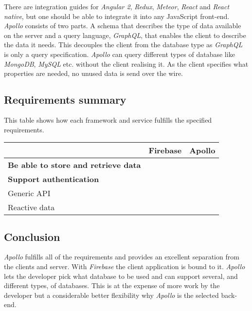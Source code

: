 There are integration guides for \textit{Angular 2}, \textit{Redux}, \textit{Meteor}, \textit{React} and \textit{React native}, but one should be able to integrate it into any JavaScript front-end.
\textit{Apollo} consists of two parts. 
A schema that describes the type of data available on the server and a query language, \textit{GraphQL}, that enables the client to describe the data it needs. 
This decouples the client from the database type as \textit{GraphQL} is only a query specification.
\textit{Apollo} can query different types of database like \textit{MongoDB}, \textit{MySQL} etc. without the client realising it.
As the client specifies what properties are needed, no unused data is send over the wire.

\subsection*{Requirements summary}
This table shows how each framework and service fulfills the specified requirements.
	
	\begin{tabularx}{\textwidth}{|l|C C|}
	\hline 
	 & Firebase & Apollo \\ 
	\hline 
	\textbf{Be able to store and retrieve data} & \cmark & \cmark \\ 
	\hline
	\textbf{Support authentication} & \cmark & \cmark \\ 
	\hline 
	Generic API & \xmark & \cmark \\ 
	\hline 
	Reactive data & \cmark & \cmark \\ 
	\hline 	
	\end{tabularx} 
	
\subsection*{Conclusion}
\textit{Apollo} fulfills all of the requirements and provides an excellent separation from the clients and server.
With \textit{Firebase} the client application is bound to it. 
\textit{Apollo} lets the developer pick what database to be used and can support several, and different types, of databases. 
This is at the expense of more work by the developer but a considerable better flexibility why \textit{Apollo} is the selected back-end.